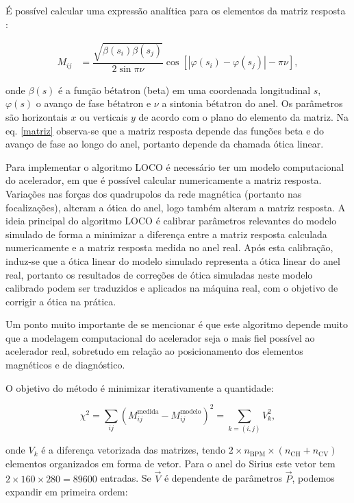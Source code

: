É possível calcular uma expressão analítica para os elementos da matriz resposta \cite{wiedemann2007particle}:

\begin{align}
M_{ij} &= \dfrac{\sqrt{\beta(s_i)\beta(s_j)}}{2\sin\pi\nu}\cos\left[ |\varphi(s_i) - \varphi(s_j)| - \pi\nu \right],
\label{matriz}
\end{align}

onde $\beta(s)$ é a função bétatron (beta) em uma coordenada longitudinal $s$, $\varphi(s)$ o avanço de fase bétatron e $\nu$ a sintonia bétatron do anel. Os parâmetros são horizontais $x$ ou verticais $y$ de acordo com o plano do elemento da matriz. Na eq. \eqref{matriz} observa-se que a matriz resposta depende das funções beta e do avanço de fase ao longo do anel, portanto depende da chamada ótica linear. 

Para implementar o algoritmo LOCO é necessário ter um modelo computacional do acelerador, em que é possível calcular numericamente a matriz resposta. Variações nas forças dos quadrupolos da rede magnética (portanto nas focalizações), alteram a ótica do anel, logo também alteram a matriz resposta. A ideia principal do algoritmo LOCO é calibrar parâmetros relevantes do modelo simulado de forma a minimizar a diferença entre a matriz resposta calculada numericamente e a matriz resposta medida no anel real. Após esta calibração, induz-se que a ótica linear do modelo simulado representa a ótica linear do anel real, portanto os resultados de correções de ótica simuladas neste modelo calibrado podem ser traduzidos e aplicados na máquina real, com o objetivo de corrigir a ótica na prática. 

Um ponto muito importante de se mencionar é que este algoritmo depende muito que a modelagem computacional do acelerador seja o mais fiel possível ao acelerador real, sobretudo em relação ao posicionamento dos elementos magnéticos e de diagnóstico.

O objetivo do método é minimizar iterativamente a quantidade:

\begin{equation}
    \chi^2 = \sum_{ij} \left(M^{\mathrm{medida}}_{ij} - M^{\mathrm{modelo}}_{ij}\right)^2 = \sum_{{k = (i,j)}} V_{k}^2,
\end{equation}

onde $V_{k}$ é a diferença vetorizada das matrizes, tendo $2 \times n_{\mathrm{BPM}} \times (n_\mathrm{{CH}} + n_\mathrm{{CV}})$ elementos organizados em forma de vetor. Para o anel do Sirius este vetor tem $2 \times 160 \times 280 = 89600$ entradas. Se $\vec{V}$ é dependente de parâmetros $\vec{P}$, podemos expandir em primeira ordem:

